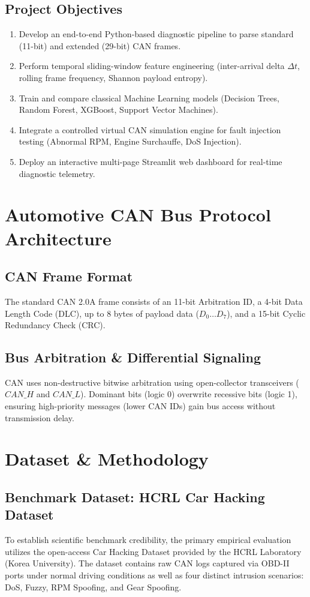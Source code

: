 \documentclass[12pt,a4paper]{report}
\begin{document}
\section{Project Objectives}
\begin{enumerate}
    \item Develop an end-to-end Python-based diagnostic pipeline to parse standard (11-bit) and extended (29-bit) CAN frames.
    \item Perform temporal sliding-window feature engineering (inter-arrival delta $\Delta t$, rolling frame frequency, Shannon payload entropy).
    \item Train and compare classical Machine Learning models (Decision Trees, Random Forest, XGBoost, Support Vector Machines).
    \item Integrate a controlled virtual CAN simulation engine for fault injection testing (Abnormal RPM, Engine Surchauffe, DoS Injection).
    \item Deploy an interactive multi-page Streamlit web dashboard for real-time diagnostic telemetry.
\end{enumerate}

\chapter{Automotive CAN Bus Protocol Architecture}
\section{CAN Frame Format}
The standard CAN 2.0A frame consists of an 11-bit Arbitration ID, a 4-bit Data Length Code (DLC), up to 8 bytes of payload data ($D_0 \dots D_7$), and a 15-bit Cyclic Redundancy Check (CRC).

\section{Bus Arbitration \& Differential Signaling}
CAN uses non-destructive bitwise arbitration using open-collector transceivers ($CAN\_H$ and $CAN\_L$). Dominant bits (logic 0) overwrite recessive bits (logic 1), ensuring high-priority messages (lower CAN IDs) gain bus access without transmission delay.

\chapter{Dataset \& Methodology}
\section{Benchmark Dataset: HCRL Car Hacking Dataset}
To establish scientific benchmark credibility, the primary empirical evaluation utilizes the open-access Car Hacking Dataset provided by the HCRL Laboratory (Korea University). The dataset contains raw CAN logs captured via OBD-II ports under normal driving conditions as well as four distinct intrusion scenarios: DoS, Fuzzy, RPM Spoofing, and Gear Spoofing.
\end{document}
